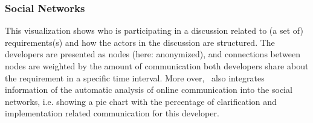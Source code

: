 \subsubsection{Social Networks} 
This visualization shows who is participating in a discussion related to (a set of) requirements(s) and how the actors in the discussion are structured. 
The developers are presented as nodes (here: anonymized), and connections between nodes are weighted by the amount of communication both developers share about the requirement in a specific time interval. 
More over, \viss\ also integrates information of the automatic analysis of online communication into the social networks, i.e. showing a pie chart with the percentage of clarification and implementation related communication for this developer.

